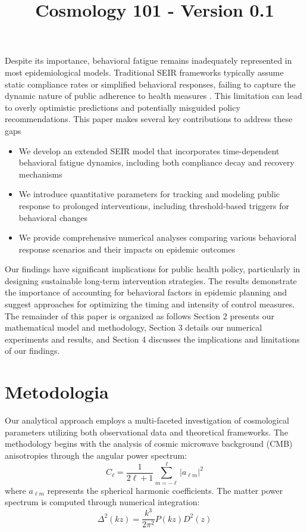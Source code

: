\documentclass{article}\usepackage{graphicx} \usepackage{amsmath} \usepackage{colortbl}\title{Cosmology 101 - Version 0.1}
\begin{document}
Despite its importance, behavioral fatigue remains inadequately represented in most epidemiological models. Traditional SEIR frameworks typically assume static compliance rates or simplified behavioral responses, failing to capture the dynamic nature of public adherence to health measures \cite{verelst2016behavioural}. This limitation can lead to overly optimistic predictions and potentially misguided policy recommendations.
This paper makes several key contributions to address these gaps
\begin{itemize}
\item We develop an extended SEIR model that incorporates time-dependent behavioral fatigue dynamics, including both compliance decay and recovery mechanisms
\item We introduce quantitative parameters for tracking and modeling public response to prolonged interventions, including threshold-based triggers for behavioral changes
\item We provide comprehensive numerical analyses comparing various behavioral response scenarios and their impacts on epidemic outcomes
\end{itemize}
Our findings have significant implications for public health policy, particularly in designing sustainable long-term intervention strategies. The results demonstrate the importance of accounting for behavioral factors in epidemic planning and suggest approaches for optimizing the timing and intensity of control measures. The remainder of this paper is organized as follows Section 2 presents our mathematical model and methodology, Section 3 details our numerical experiments and results, and Section 4 discusses the implications and limitations of our findings.\section{Metodologia}
Our analytical approach employs a multi-faceted investigation of cosmological parameters utilizing both observational data and theoretical frameworks. The methodology begins with the analysis of cosmic microwave background (CMB) anisotropies through the angular power spectrum:  
\begin{equation} C_\ell = \frac{1}{2\ell + 1}\sum_{m=-\ell}^{\ell} |a_{\ell m}|^2 
\end{equation}  
where $a_{\ell m}$ represents the spherical harmonic coefficients. The matter power spectrum is computed through numerical integration:  \begin{equation} \Delta^2(k z) = \frac{k^3}{2\pi^2}P(k z)D^2(z) 
\end{equation}  
\end{document}
